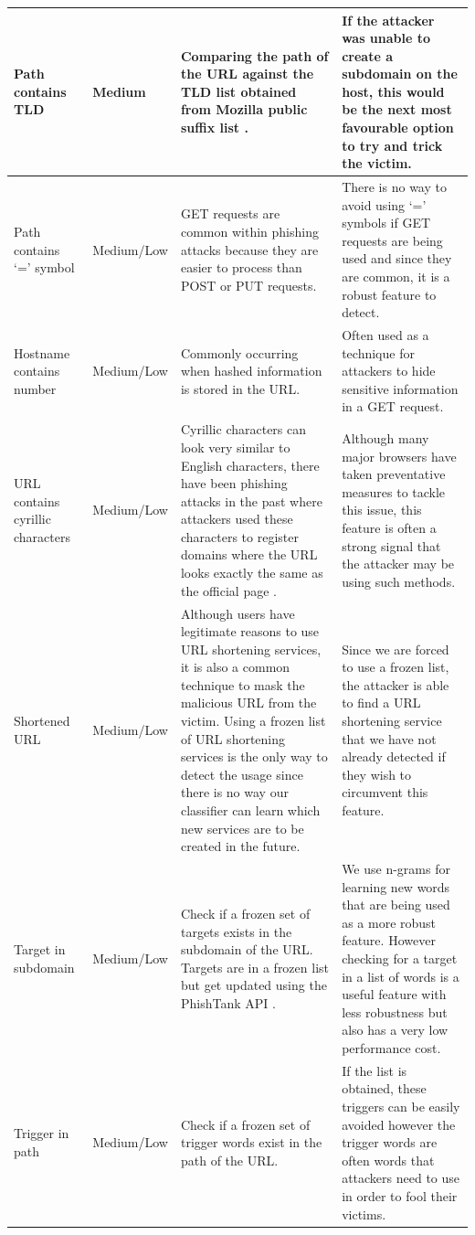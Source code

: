 \documentclass[12pt,twoside]{report}
\begin{document}
\begin{center}
\begin{longtable}{ |>{\raggedright\arraybackslash}p{}|>{\raggedright\arraybackslash}p{}|>{\raggedright\arraybackslash}p{}|>{\raggedright\arraybackslash}p{}| }
\hline
Path contains TLD & Medium & Comparing the path of the URL against the TLD list obtained from Mozilla public suffix list \cite{publicsuffixmozilla}. & If the attacker was unable to create a subdomain on the host, this would be the next most favourable option to try and trick the victim. \\
\hline
Path contains `=' symbol & Medium/Low & GET requests are common within phishing attacks because they are easier to process than POST or PUT requests. & There is no way to avoid using `=' symbols if GET requests are being used and since they are common, it is a robust feature to detect. \\
\hline
Hostname contains number & Medium/Low & Commonly occurring when hashed information is stored in the URL. & Often used as a technique for attackers to hide sensitive information in a GET request. \\
\hline
URL contains cyrillic characters & Medium/Low & Cyrillic characters can look very similar to English characters, there have been phishing attacks in the past where attackers used these characters to register domains where the URL looks exactly the same as the official page \cite{xudongs}. & Although many major browsers have taken preventative measures to tackle this issue, this feature is often a strong signal that the attacker may be using such methods.\\
\hline
Shortened URL & Medium/Low & Although users have legitimate reasons to use URL shortening services, it is also a common technique to mask the malicious URL from the victim. \newline\newline Using a frozen list of URL shortening services is the only way to detect the usage since there is no way our classifier can learn which new services are to be created in the future. & Since we are forced to use a frozen list, the attacker is able to find a URL shortening service that we have not already detected if they wish to circumvent this feature. \\
\hline
Target in subdomain & Medium/Low & Check if a frozen set of targets exists in the subdomain of the URL. Targets are in a frozen list but get updated using the PhishTank API \cite{phishtank}.  & We use n-grams for learning new words that are being used as a more robust feature. However checking for a target in a list of words is a useful feature with less robustness but also has a very low performance cost.\\
\hline
Trigger in path & Medium/Low & Check if a frozen set of trigger words exist in the path of the URL. & If the list is obtained, these triggers can be easily avoided however the trigger words are often words that attackers need to use in order to fool their victims. \\

\end{longtable}
\end{center}
\end{document}
